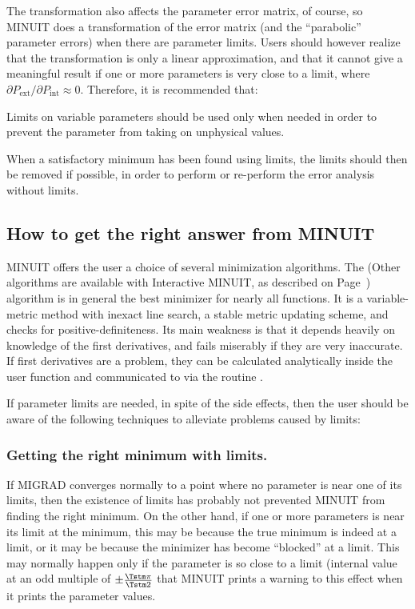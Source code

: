 The transformation also affects the parameter error matrix, of course,
so MINUIT does a transformation of the error matrix (and the 
``parabolic'' parameter errors) when there are parameter limits.
Users should however realize that the transformation is only a linear
approximation, and that it cannot give a meaningful result if one or more
parameters is very close to a limit, where
$\partial P_{\mathrm{ext}} / \partial P_{\mathrm{int}} \approx 0$.
Therefore, it is recommended that:
\begin{UL}
\item Limits on variable parameters should be used only when needed in order
to prevent the parameter from taking on unphysical values.
\item When a satisfactory minimum has been found using limits, the limits
should then be removed if possible, in order to perform or re-perform the
error analysis without limits.
\end{UL}

\subsection{How to get the right answer from MINUIT}

MINUIT offers the user a choice of several minimization algorithms.
The  (Other algorithms are available with 
Interactive MINUIT, as described on Page~\pageref{H2MWMIN})
algorithm is in general the best minimizer for nearly all functions. 
It is a 
variable-metric method with inexact line search, a stable
metric updating scheme, and checks for positive-definiteness.
Its main weakness is that it depends heavily on knowledge of the
first derivatives, and fails miserably if they are very inaccurate.
If first derivatives are a problem, they can be
calculated analytically inside the user function and communicated
to \PAW{} via the routine .

If parameter limits are needed, in spite of the side effects,
then the user should be aware of the following
techniques to alleviate problems caused by limits:

\subsubsection*{Getting the right minimum with limits.}

If MIGRAD converges normally to a point where no parameter is
near one of its limits, then the existence of limits has
probably not prevented MINUIT from finding the right minimum.
On the other hand, if one or more parameters is near its limit
at the minimum, this may be because the true minimum is indeed
at a limit, or it may be because the minimizer has become 
``blocked'' at a limit.  
This may normally happen only if the parameter
is so close to a limit (internal value at an odd multiple
of $\pm \frac{\Tstm \pi}{\Tstm 2}$ that MINUIT prints a warning to this effect
when it prints the parameter values.


